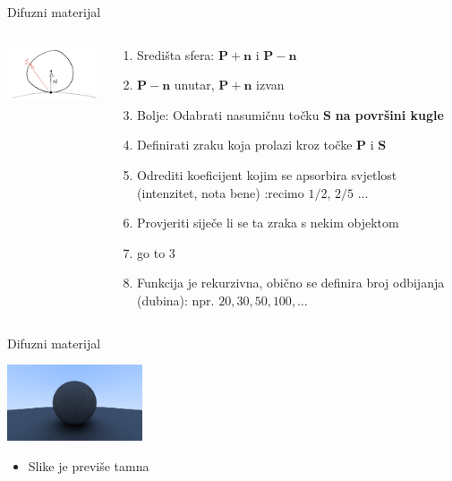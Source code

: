\documentclass[9pt]{beamer}
\begin{document}
\begin{frame}{Difuzni materijal}
	\begin{columns}
		\begin{column}{0.3\textwidth}
			\begin{center}
				\includegraphics[width=4cm]{slike/fig-1.10-rand-unitvec.png}
			\end{center}
		\end{column}
		\begin{column}{0.7\textwidth}
			\begin{enumerate}
				\item Središta sfera: $\mathbf{P} + \mathbf{n}$ i $\mathbf{P} - \mathbf{n}$
				\item $\mathbf{P} - \mathbf{n}$ unutar, $\mathbf{P} + \mathbf{n}$ izvan
				\item \alert{Bolje: Odabrati nasumičnu točku $\mathbf{S}$ \textbf{na površini kugle} }
				\item Definirati zraku koja prolazi kroz točke $\mathbf{P}$ i $\mathbf{S}$
				\item Odrediti koeficijent kojim se apsorbira svjetlost (intenzitet, nota bene)  :recimo $1/2$, $2/5$ $\ldots$
				\item Provjeriti siječe li se ta zraka s nekim objektom
				\item go to 3
				\item Funkcija je rekurzivna, obično se definira broj odbijanja (dubina): npr. $20, 30, 50, 100, \ldots$
			\end{enumerate}
		\end{column}
	\end{columns}
\end{frame}

\begin{frame}{Difuzni materijal}
	\begin{center}
		\includegraphics[width=4cm]{slike/img-1.07-first-diffuse.png}
	\end{center}
	\begin{itemize}
		\item Slike je previše tamna
	\end{itemize}
\end{frame}
\end{document}
